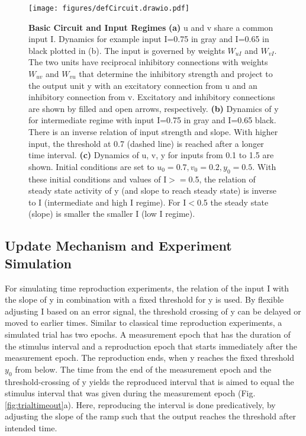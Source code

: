 \documentclass[9pt]{article}
\begin{document}
\begin{figure}[h]
	\centering
	\texttt{[image: figures/defCircuit.drawio.pdf]}
	\caption{\textbf{Basic Circuit and Input Regimes} 
	\textbf{(a)} u and v share a common input I. Dynamics for example input I=0.75 in gray and I=0.65 in black plotted in (b). The input is governed by weights $W_{uI}$ and $W_{vI}$. The two units have reciprocal inhibitory connections with weights $W_{uv}$ and $W_{vu}$ that determine the inhibitory strength and project to the output unit y with an excitatory connection from u and an inhibitory connection from v. Excitatory and inhibitory connections are shown by filled and open arrows, respectively. 
	\textbf{(b)} Dynamics of y for intermediate regime with input I=0.75 in gray and I=0.65 black. There is an inverse relation of input strength and slope. With higher input, the threshold at 0.7 (dashed line) is reached after a longer time interval. 
	\textbf{(c)} Dynamics of u, v, y for inputs from 0.1 to 1.5 are shown. Initial conditions are set to $u_0=0.7 , v_0=0.2 , y_0=0.5$. With these initial conditions and values of I$>=$0.5, the relation of steady state activity of y (and slope to reach steady state) is inverse to I (intermediate and high I regime). For I$<$0.5 the steady state (slope) is smaller the smaller I (low I regime).}
\label{fig:circuit}
\end{figure}


\subsection{Update Mechanism and Experiment Simulation}
For simulating time reproduction experiments, the relation of the input I with the slope of y in combination with a fixed threshold for y is used.
By flexible adjusting I based on an error signal, the threshold crossing of y can be delayed or moved to earlier times.
Similar to classical time reproduction experiments, a simulated trial has two epochs. A measurement epoch that has the duration of the stimulus interval and a reproduction epoch that starts immediately after the measurement epoch. The reproduction ends, when y reaches the fixed threshold $y_0$ from below. 
The time from the end of the measurement epoch and the threshold-crossing of y yields the reproduced interval that is aimed to equal the stimulus interval that was given during the measurement epoch (Fig. \ref{fig:trialtimeout}a).
Here, reproducing the interval is done predicatively, by adjusting the slope of the ramp such that the output reaches the threshold after intended time.
\end{document}
